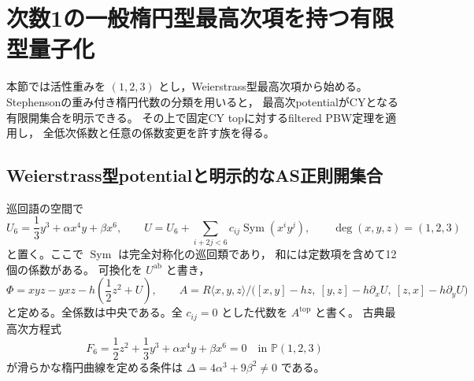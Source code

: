 \section{次数1の一般楕円型最高次項を持つ有限型量子化}
\label{sec:elliptic-degree-one-finite}

本節では活性重みを $(1,2,3)$ とし，Weierstrass型最高次項から始める。
Stephensonの重み付き楕円代数の分類を用いると，
最高次potentialがCYとなる有限開集合を明示できる。
その上で固定CY topに対するfiltered PBW定理を適用し，
全低次係数と任意の係数変更を許す族を得る。

\subsection{Weierstrass型potentialと明示的なAS正則開集合}

巡回語の空間で
\[
 U_6=\frac13y^3+\alpha x^4y+\beta x^6,\qquad
 U=U_6+\sum_{i+2j<6}c_{ij}\operatorname{Sym}(x^iy^j),
 \qquad \deg(x,y,z)=(1,2,3)
\]
と置く。ここで $\operatorname{Sym}$ は完全対称化の巡回類であり，
和には定数項を含めて12個の係数がある。
可換化を $U^{\mathrm{ab}}$ と書き，
\begin{equation}\label{eq:degree-one-elliptic-potential}
 \Phi=xyz-yxz-h\left(\frac12z^2+U\right),\qquad
 A=R\langle x,y,z\rangle/
 \bigl([x,y]-hz,\ [y,z]-h\partial_xU,\ [z,x]-h\partial_yU\bigr)
\end{equation}
と定める。全係数は中央である。全 $c_{ij}=0$ とした代数を
$A^{\mathrm{top}}$ と書く。
古典最高次方程式
\[
 F_6=\frac12z^2+\frac13y^3+\alpha x^4y+\beta x^6=0
 \quad\text{in }\mathbb P(1,2,3)
\]
が滑らかな楕円曲線を定める条件は
$\Delta=4\alpha^3+9\beta^2\ne0$ である。

